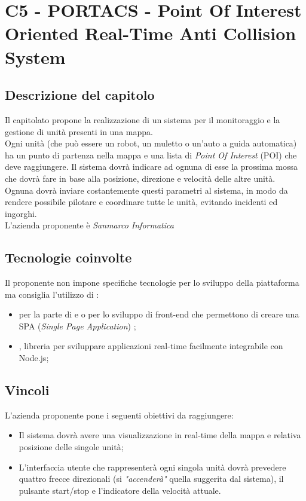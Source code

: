 \section{C5 - PORTACS - Point Of Interest  Oriented Real-Time Anti Collision System}

\subsection{Descrizione del capitolo}
Il capitolato propone la realizzazione di un sistema per il monitoraggio e la gestione di unità presenti in una mappa.\\
Ogni unità (che può essere un robot, un muletto o un'auto a guida automatica) ha un punto di partenza nella mappa e una lista di \textit{Point Of Interest} (POI) che deve raggiungere.
Il sistema dovrà indicare ad ognuna di esse la prossima mossa che dovrà fare in base alla posizione, direzione e velocità  delle altre unità. Ognuna dovrà inviare costantemente questi parametri al sistema, in modo da rendere possibile pilotare e coordinare tutte le unità, evitando incidenti ed ingorghi.\\
L'azienda proponente è \textit{Sanmarco Informatica}

\subsection{Tecnologie coinvolte}
Il proponente non impone specifiche tecnologie per lo sviluppo della piattaforma ma consiglia l'utilizzo di :
\begin{itemize}
\item {} per la parte di  e  o   per lo sviluppo di front-end che permettono di creare una SPA (\textit{Single Page Application}) ;
\item {}, libreria per sviluppare applicazioni real-time facilmente integrabile con Node.js;
\end{itemize}

\subsection{Vincoli}
L'azienda proponente pone i seguenti obiettivi da raggiungere:

\begin{itemize}
\item Il sistema dovrà avere una visualizzazione in real-time della mappa e relativa posizione delle singole unità;
\item L'interfaccia utente che rappresenterà ogni singola unità  dovrà prevedere quattro frecce direzionali (si \textit{"accenderà"} quella suggerita dal sistema), il pulsante start/stop e l'indicatore della velocità attuale.
\end{itemize}


